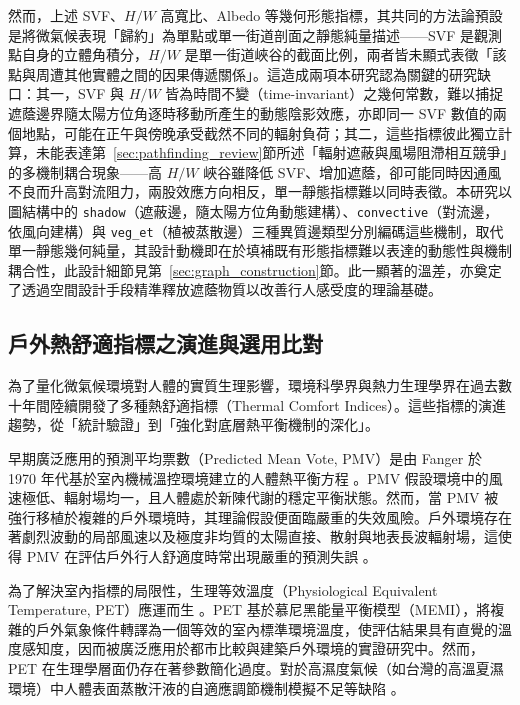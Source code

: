 然而，上述 SVF、$H/W$ 高寬比、Albedo 等幾何形態指標，其共同的方法論預設是將微氣候表現「歸約」為單點或單一街道剖面之靜態純量描述——SVF 是觀測點自身的立體角積分，$H/W$ 是單一街道峽谷的截面比例，兩者皆未顯式表徵「該點與周遭其他實體之間的因果傳遞關係」。這造成兩項本研究認為關鍵的研究缺口：其一，SVF 與 $H/W$ 皆為時間不變（time-invariant）之幾何常數，難以捕捉遮蔭邊界隨太陽方位角逐時移動所產生的動態陰影效應，亦即同一 SVF 數值的兩個地點，可能在正午與傍晚承受截然不同的輻射負荷；其二，這些指標彼此獨立計算，未能表達第~\ref{sec:pathfinding_review}節所述「輻射遮蔽與風場阻滯相互競爭」的多機制耦合現象——高 $H/W$ 峽谷雖降低 SVF、增加遮蔭，卻可能同時因通風不良而升高對流阻力，兩股效應方向相反，單一靜態指標難以同時表徵。本研究以圖結構中的 \texttt{shadow}（遮蔽邊，隨太陽方位角動態建構）、\texttt{convective}（對流邊，依風向建構）與 \texttt{veg\_et}（植被蒸散邊）三種異質邊類型分別編碼這些機制，取代單一靜態幾何純量，其設計動機即在於填補既有形態指標難以表達的動態性與機制耦合性，此設計細節見第~\ref{sec:graph_construction}節。此一顯著的溫差，亦奠定了透過空間設計手段精準釋放遮蔭物質以改善行人感受度的理論基礎。


\subsection{戶外熱舒適指標之演進與選用比對}
\label{subsec:thermal_indices}

為了量化微氣候環境對人體的實質生理影響，環境科學界與熱力生理學界在過去數十年間陸續開發了多種熱舒適指標（Thermal Comfort Indices）。這些指標的演進趨勢，從「統計驗證」到「強化對底層熱平衡機制的深化」。

早期廣泛應用的預測平均票數（Predicted Mean Vote, PMV）是由 Fanger 於 1970 年代基於室內機械溫控環境建立的人體熱平衡方程 \citep{fanger1970thermal}。PMV 假設環境中的風速極低、輻射場均一，且人體處於新陳代謝的穩定平衡狀態。然而，當 PMV 被強行移植於複雜的戶外環境時，其理論假設便面臨嚴重的失效風險。戶外環境存在著劇烈波動的局部風速以及極度非均質的太陽直接、散射與地表長波輻射場，這使得 PMV 在評估戶外行人舒適度時常出現嚴重的預測失誤 \citep{blazejczyk2012comparison}。

為了解決室內指標的局限性，生理等效溫度（Physiological Equivalent Temperature, PET）應運而生 \citep{hoppe1999physiological}。PET 基於慕尼黑能量平衡模型（MEMI），將複雜的戶外氣象條件轉譯為一個等效的室內標準環境溫度，使評估結果具有直覺的溫度感知度，因而被廣泛應用於都市比較與建築戶外環境的實證研究中。然而，PET 在生理學層面仍存在著參數簡化過度。對於高濕度氣候（如台灣的高溫夏濕環境）中人體表面蒸散汗液的自適應調節機制模擬不足等缺陷 \citep{blazejczyk2012comparison}。

